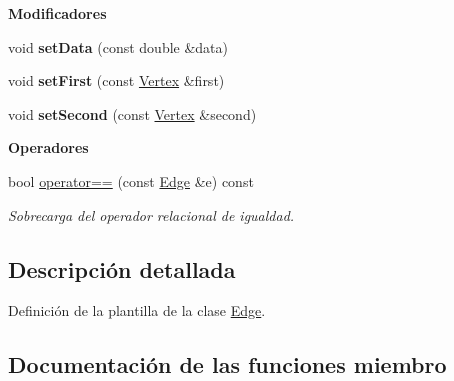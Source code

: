 \begin{Indent}{\bf Modificadores}\par
\begin{DoxyCompactItemize}
\item 
\hypertarget{classedi_1_1Edge_a0a3d03f9b68bb170c83851885542fe81}{}void {\bfseries set\+Data} (const double \&data)\label{classedi_1_1Edge_a0a3d03f9b68bb170c83851885542fe81}

\item 
\hypertarget{classedi_1_1Edge_add3c3d74af84f7c841e35fc4cdc18b92}{}void {\bfseries set\+First} (const \hyperlink{classedi_1_1Vertex}{Vertex} \&first)\label{classedi_1_1Edge_add3c3d74af84f7c841e35fc4cdc18b92}

\item 
\hypertarget{classedi_1_1Edge_a23168fba337f88426b776b9b00e21ce4}{}void {\bfseries set\+Second} (const \hyperlink{classedi_1_1Vertex}{Vertex} \&second)\label{classedi_1_1Edge_a23168fba337f88426b776b9b00e21ce4}

\end{DoxyCompactItemize}
\end{Indent}
\begin{Indent}{\bf Operadores}\par
\begin{DoxyCompactItemize}
\item 
bool \hyperlink{classedi_1_1Edge_ab1bbb20a4ea2c016acd11a40376a3ffe}{operator==} (const \hyperlink{classedi_1_1Edge}{Edge} \&e) const 
\begin{DoxyCompactList}\small\item\em Sobrecarga del operador relacional de igualdad. \end{DoxyCompactList}\end{DoxyCompactItemize}
\end{Indent}


\subsection{Descripción detallada}
Definición de la plantilla de la clase \hyperlink{classedi_1_1Edge}{Edge}. 

\subsection{Documentación de las funciones miembro}
\hypertarget{classedi_1_1Edge_ab1bbb20a4ea2c016acd11a40376a3ffe}{}
